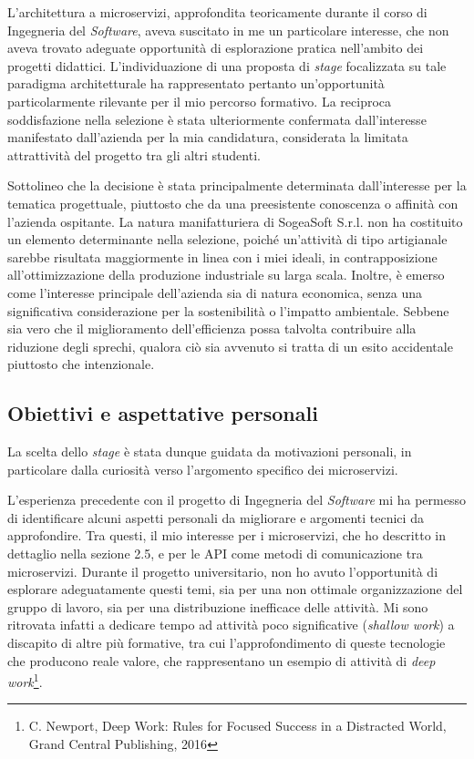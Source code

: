     \vspace{0.2 em}
    \noindent L'architettura a microservizi, approfondita teoricamente durante il corso di Ingegneria del \textit{Software}, aveva suscitato in me un particolare interesse, che non aveva trovato adeguate opportunità di esplorazione pratica nell'ambito dei progetti didattici. L'individuazione di una proposta di \textit{stage} focalizzata su tale paradigma architetturale ha rappresentato pertanto un'opportunità particolarmente rilevante per il mio percorso formativo. La reciproca soddisfazione nella selezione è stata ulteriormente confermata dall'interesse manifestato dall'azienda per la mia candidatura, considerata la limitata attrattività del progetto tra gli altri studenti.

    \vspace{0.2 em}
    \noindent Sottolineo che la decisione è stata principalmente determinata dall'interesse per la tematica progettuale, piuttosto che da una preesistente conoscenza o affinità con l'azienda ospitante. La natura manifatturiera di SogeaSoft S.r.l. non ha costituito un elemento determinante nella selezione, poiché un'attività di tipo artigianale sarebbe risultata maggiormente in linea con i miei ideali, in contrapposizione all’ottimizzazione della produzione industriale su larga scala. Inoltre, è emerso come l’interesse principale dell’azienda sia di natura economica, senza una significativa considerazione per la sostenibilità o l’impatto ambientale. Sebbene sia vero che il miglioramento dell’efficienza possa talvolta contribuire alla riduzione degli sprechi, qualora ciò sia avvenuto si tratta di un esito accidentale piuttosto che intenzionale.

    
        \subsection{Obiettivi e aspettative personali}
        \noindent La scelta dello \textit{stage} è stata dunque guidata da motivazioni personali, in particolare dalla curiosità verso l'argomento specifico dei microservizi.

        \vspace{0.2 em}
        \noindent L'esperienza precedente con il progetto di Ingegneria del \textit{Software} mi ha permesso di identificare alcuni aspetti personali da migliorare e argomenti tecnici da approfondire. Tra questi, il mio interesse per i microservizi, che ho descritto in dettaglio nella sezione 2.5, e per le API come metodi di comunicazione tra microservizi. Durante il progetto universitario, non ho avuto l'opportunità di esplorare adeguatamente questi temi, sia per una non ottimale organizzazione del gruppo di lavoro, sia per una distribuzione inefficace delle attività. Mi sono ritrovata infatti a dedicare tempo ad attività poco significative (\textit{shallow work}) a discapito di altre più formative, tra cui l'approfondimento di queste tecnologie che producono reale valore, che rappresentano un esempio di attività di \textit{deep work}\footnote{C. Newport, Deep Work: Rules for Focused Success in a Distracted World, Grand Central Publishing, 2016}.

